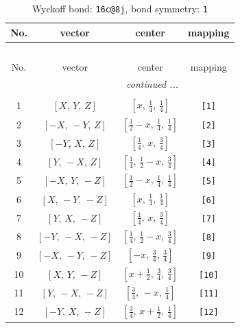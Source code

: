 \documentclass[fleqn,8pt]{jsarticle}
\begin{document}
\begin{longtable}{cccc}
\caption{Wyckoff bond: {\tt 16c@8j}, bond symmetry: {\tt 1}}
 \\
 \hline \hline
No. & vector & center & mapping \\ \hline \endfirsthead

\multicolumn{3}{l}{\tablename\ \thetable{}} \\
 \hline \hline
No. & vector & center & mapping \\ \hline \endhead

 \hline \hline
\multicolumn{3}{r}{\footnotesize\it continued ...} \\ \endfoot

 \hline \hline
\multicolumn{3}{r}{} \\ \endlastfoot

1 & $\left[ X,\, Y,\, Z \right]$ & $\left[ x,\, \frac{1}{4},\, \frac{1}{4} \right]$ & {\tt [1]} \\ \hline
2 & $\left[ - X,\, - Y,\, Z \right]$ & $\left[ \frac{1}{2} - x,\, \frac{1}{4},\, \frac{1}{4} \right]$ & {\tt [2]} \\ \hline
3 & $\left[ - Y,\, X,\, Z \right]$ & $\left[ \frac{1}{4},\, x,\, \frac{3}{4} \right]$ & {\tt [3]} \\ \hline
4 & $\left[ Y,\, - X,\, Z \right]$ & $\left[ \frac{1}{4},\, \frac{1}{2} - x,\, \frac{3}{4} \right]$ & {\tt [4]} \\ \hline
5 & $\left[ - X,\, Y,\, - Z \right]$ & $\left[ \frac{1}{2} - x,\, \frac{1}{4},\, \frac{1}{4} \right]$ & {\tt [5]} \\ \hline
6 & $\left[ X,\, - Y,\, - Z \right]$ & $\left[ x,\, \frac{1}{4},\, \frac{1}{4} \right]$ & {\tt [6]} \\ \hline
7 & $\left[ Y,\, X,\, - Z \right]$ & $\left[ \frac{1}{4},\, x,\, \frac{3}{4} \right]$ & {\tt [7]} \\ \hline
8 & $\left[ - Y,\, - X,\, - Z \right]$ & $\left[ \frac{1}{4},\, \frac{1}{2} - x,\, \frac{3}{4} \right]$ & {\tt [8]} \\ \hline
9 & $\left[ - X,\, - Y,\, - Z \right]$ & $\left[ - x,\, \frac{3}{4},\, \frac{3}{4} \right]$ & {\tt [9]} \\ \hline
10 & $\left[ X,\, Y,\, - Z \right]$ & $\left[ x + \frac{1}{2},\, \frac{3}{4},\, \frac{3}{4} \right]$ & {\tt [10]} \\ \hline
11 & $\left[ Y,\, - X,\, - Z \right]$ & $\left[ \frac{3}{4},\, - x,\, \frac{1}{4} \right]$ & {\tt [11]} \\ \hline
12 & $\left[ - Y,\, X,\, - Z \right]$ & $\left[ \frac{3}{4},\, x + \frac{1}{2},\, \frac{1}{4} \right]$ & {\tt [12]} \\ \hline

\end{longtable}
\end{document}
